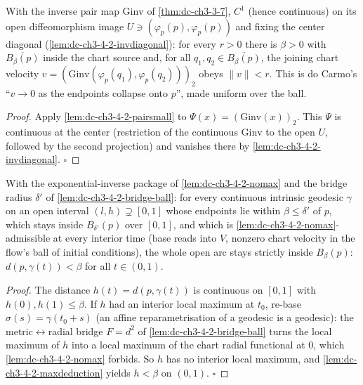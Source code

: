 \begin{lemma}
  \label{lem:dc-ch3-4-2-velsmall}
  \leanok
  With the inverse pair map $\mathrm{Ginv}$ of \cref{thm:dc-ch3-3-7}, $C^1$ (hence
  continuous) on its open diffeomorphism image $U\ni(\varphi_p(p),\varphi_p(p))$ and
  fixing the center diagonal (\cref{lem:dc-ch3-4-2-invdiagonal}): for every $r>0$
  there is $\beta>0$ with $\overline{B_\beta(p)}$ inside the chart source and, for all
  $q_1,q_2\in\overline{B_\beta(p)}$, the joining chart velocity
  $v=(\mathrm{Ginv}(\varphi_p(q_1),\varphi_p(q_2)))_2$ obeys $\|v\|<r$. This is do
  Carmo's ``$v\to0$ as the endpoints collapse onto $p$'', made uniform over the ball.
\end{lemma}
\begin{proof}
  \leanok
  Apply \cref{lem:dc-ch3-4-2-pairsmall} to $\Psi(x)=(\mathrm{Ginv}(x))_2$. This
  $\Psi$ is continuous at the center (restriction of the continuous $\mathrm{Ginv}$
  to the open $U$, followed by the second projection) and vanishes there by
  \cref{lem:dc-ch3-4-2-invdiagonal}. $\square$
\end{proof}

\begin{lemma}
  \label{lem:dc-ch3-4-2-interior}
  \leanok
  With the exponential-inverse package of \cref{lem:dc-ch3-4-2-nomax} and the bridge radius $\delta'$ of
  \cref{lem:dc-ch3-4-2-bridge-ball}: for every continuous intrinsic geodesic $\gamma$ on an open interval
  $(l,h)\supsetneq[0,1]$ whose endpoints lie within $\beta\le\delta'$ of $p$, which stays inside
  $B_{\delta'}(p)$ over $[0,1]$, and which is \cref{lem:dc-ch3-4-2-nomax}-admissible at every interior
  time (base reads into $V$, nonzero chart velocity in the flow's ball of initial conditions), the whole
  open arc stays strictly inside $B_\beta(p)$: $d(p,\gamma(t))<\beta$ for all $t\in(0,1)$.
\end{lemma}
\begin{proof}
  \leanok
  The distance $h(t)=d(p,\gamma(t))$ is continuous on $[0,1]$ with $h(0),h(1)\le\beta$. If $h$ had an
  interior local maximum at $t_0$, re-base $\sigma(s)=\gamma(t_0+s)$ (an affine reparametrisation of a
  geodesic is a geodesic): the metric$\leftrightarrow$radial bridge $F=d^2$ of
  \cref{lem:dc-ch3-4-2-bridge-ball} turns the local maximum of $h$ into a local maximum of the chart
  radial functional at $0$, which \cref{lem:dc-ch3-4-2-nomax} forbids. So $h$ has no interior local
  maximum, and \cref{lem:dc-ch3-4-2-maxdeduction} yields $h<\beta$ on $(0,1)$. $\square$
\end{proof}

